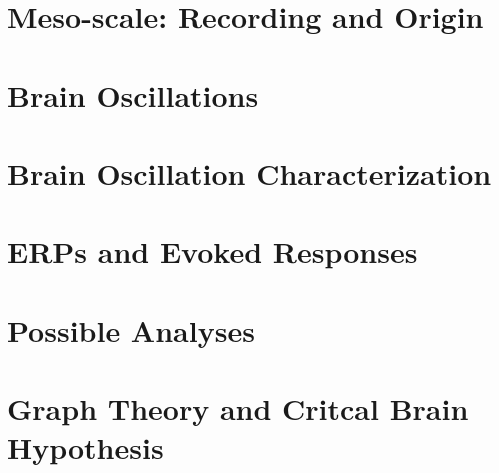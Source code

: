 \documentclass[12pt]{article}
\begin{document}
\section{Meso-scale: Recording and Origin}
\graphicspath{ {./images/9/} }

\newpage

\section{Brain Oscillations}
\graphicspath{ {./images/10/} }

\newpage

\section{Brain Oscillation Characterization}
\graphicspath{ {./images/11/} }

\newpage

\section{ERPs and Evoked Responses}
\graphicspath{ {./images/12/} }

\newpage

\section{Possible Analyses}
\graphicspath{ {./images/13/} }

\newpage

\section{Graph Theory and Critcal Brain Hypothesis}
\graphicspath{ {./images/15/} }

\newpage
\end{document}
